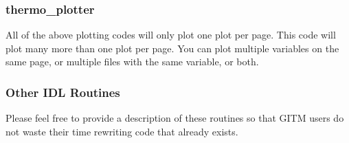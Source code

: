 \subsubsection{thermo\_plotter}

All of the above plotting codes will only plot one plot per page.  This code will plot many more than one plot per page.  You can plot multiple variables on the same page, or multiple files with the same variable, or both.

\subsubsection{Other IDL Routines}

Please feel free to provide a description of these routines so that GITM users do not waste their time rewriting code that already exists.

